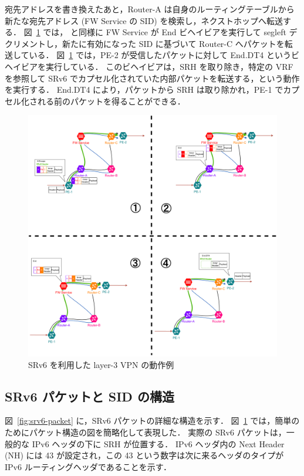 宛先アドレスを書き換えたあと，Router-A は自身のルーティングテーブルから新たな宛先アドレス (FW Service の SID) を検索し，ネクストホップへ転送する．
図~\ref*{fig:srv6-vpn}  では， と同様に FW Service が End ビヘイビアを実行して segleft デクリメントし，新たに有効になった SID に基づいて Router-C へパケットを転送している．
図~\ref*{fig:srv6-vpn}  では，PE-2 が受信したパケットに対して End.DT4 というビヘイビアを実行している．
このビヘイビアは，SRH を取り除き，特定の VRF を参照して SRv6 でカプセル化されていた内部パケットを転送する，という動作を実行する．
End.DT4 により，パケットから SRH は取り除かれ，PE-1 でカプセル化される前のパケットを得ることができる．

\begin{figure}[t]
    \centering
    \includegraphics[width=0.95\linewidth]{img/ExplainEndDT4.pdf}
    \caption{SRv6 を利用した layer-3 VPN の動作例}
    \label{fig:srv6-vpn}
\end{figure}

\subsection{SRv6 パケットと SID の構造}
\label{sbsection:srv6-sid-struct}
図~\ref*{fig:srv6-packet} に，SRv6 パケットの詳細な構造を示す．
図~\ref*{fig:srv6-vpn} では，簡単のためにパケット構造の図を簡略化して表現した．
実際の SRv6 パケットは，一般的な IPv6 ヘッダの下に SRH が位置する．
IPv6 ヘッダ内の Next Header (NH) には 43 が設定され，この 43 という数字は次に来るヘッダのタイプが IPv6 ルーティングヘッダであることを示す．

